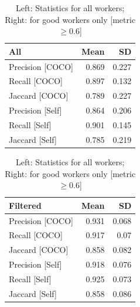 \documentclass[12pt]{article}
\begin{document}
\begin{table}[h]
\centering
\begin{tabular}{lrr}
\hline
 All              &   Mean &    SD \\
\hline
 Precision [COCO] &  0.869 & 0.227 \\
 Recall [COCO]    &  0.897 & 0.132 \\
 Jaccard [COCO]   &  0.789 & 0.227 \\
 Precision [Self] &  0.864 & 0.206 \\
 Recall [Self]    &  0.901 & 0.145 \\
 Jaccard [Self]   &  0.785 & 0.219 \\
\hline
\end{tabular}
\begin{tabular}{lrr}
\hline
Filtered                &   Mean &    SD \\
\hline
 Precision [COCO] &  0.931 & 0.068 \\
 Recall [COCO]    &  0.917 & 0.07  \\
 Jaccard [COCO]   &  0.858 & 0.082 \\
 Precision [Self] &  0.918 & 0.076 \\
 Recall [Self]    &  0.925 & 0.073 \\
 Jaccard [Self]   &  0.858 & 0.086 \\
\hline
\end{tabular}
\caption{Left: Statistics for all workers; Right: for good workers only [metric$\geq$0.6]}
\label{basic_stat}
\end{table}
\end{document}

